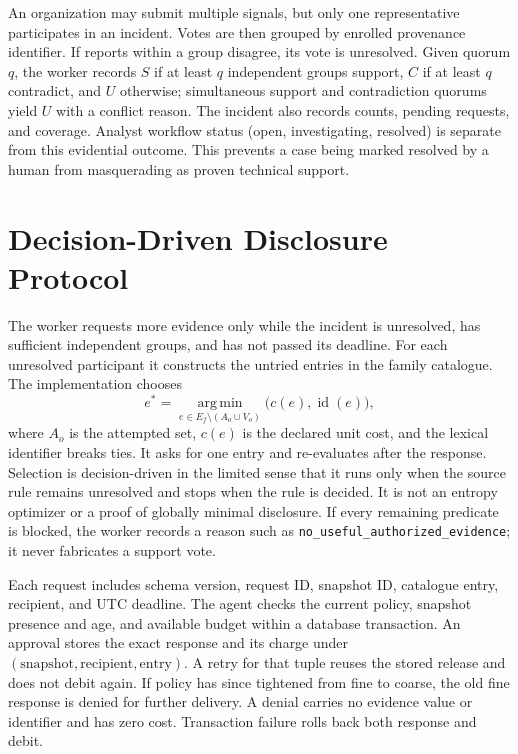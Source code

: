 \documentclass[conference,letterpaper]{IEEEtran}
\begin{document}
An organization may submit multiple signals, but only one representative participates in an incident. Votes are then grouped by enrolled provenance identifier. If reports within a group disagree, its vote is unresolved. Given quorum $q$, the worker records $S$ if at least $q$ independent groups support, $C$ if at least $q$ contradict, and $U$ otherwise; simultaneous support and contradiction quorums yield $U$ with a conflict reason. The incident also records counts, pending requests, and coverage. Analyst workflow status (open, investigating, resolved) is separate from this evidential outcome. This prevents a case being marked resolved by a human from masquerading as proven technical support.

\section{Decision-Driven Disclosure Protocol}
The worker requests more evidence only while the incident is unresolved, has sufficient independent groups, and has not passed its deadline. For each unresolved participant it constructs the untried entries in the family catalogue. The implementation chooses
\begin{equation}
e^*=\operatorname*{arg\,min}_{e\in E_f\setminus(A_o\cup V_o)}\big(c(e),\operatorname{id}(e)\big),
\label{eq:select}
\end{equation}
where $A_o$ is the attempted set, $c(e)$ is the declared unit cost, and the lexical identifier breaks ties. It asks for one entry and re-evaluates after the response. Selection is decision-driven in the limited sense that it runs only when the source rule remains unresolved and stops when the rule is decided. It is not an entropy optimizer or a proof of globally minimal disclosure. If every remaining predicate is blocked, the worker records a reason such as \texttt{no\_useful\_authorized\_evidence}; it never fabricates a support vote.

Each request includes schema version, request ID, snapshot ID, catalogue entry, recipient, and UTC deadline. The agent checks the current policy, snapshot presence and age, and available budget within a database transaction. An approval stores the exact response and its charge under $(\text{snapshot},\text{recipient},\text{entry})$. A retry for that tuple reuses the stored release and does not debit again. If policy has since tightened from fine to coarse, the old fine response is denied for further delivery. A denial carries no evidence value or identifier and has zero cost. Transaction failure rolls back both response and debit.
\end{document}
